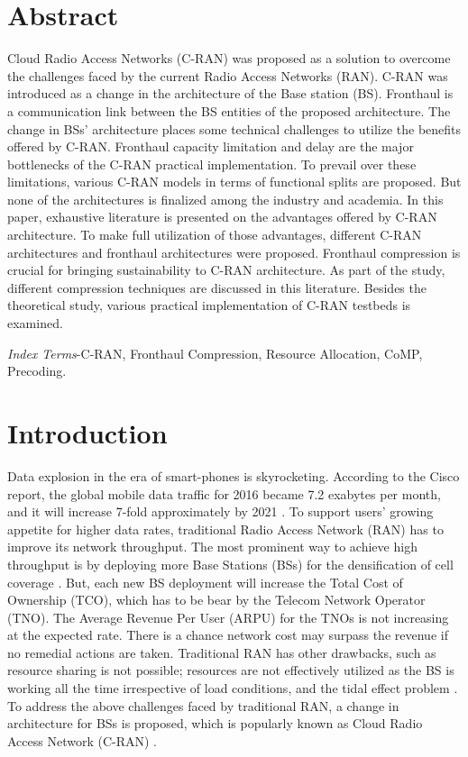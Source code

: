 \begin{multicols}{2}

\section*{Abstract}

Cloud Radio Access Networks (C-RAN) was proposed as a solution to overcome the challenges faced by the current Radio Access Networks (RAN). C-RAN was introduced as a change in the architecture of the Base station (BS). Fronthaul is a communication link between the BS entities of the proposed architecture. The change in BSs’ architecture places some technical challenges to utilize the benefits offered by C-RAN. Fronthaul capacity limitation and delay are the major bottlenecks of the C-RAN practical implementation. To prevail over these limitations, various C-RAN models in terms of functional splits are proposed. But none of the architectures is finalized among the industry and academia. In this paper, exhaustive literature is presented on the advantages offered by C-RAN architecture. To make full utilization of those advantages, different C-RAN architectures and fronthaul architectures were proposed. Fronthaul compression is crucial for bringing sustainability to C-RAN architecture. As part of the study, different compression techniques are discussed in this literature. Besides the theoretical study, various practical implementation of C-RAN testbeds is examined.

\textit{Index Terms}-C-RAN, Fronthaul Compression, Resource Allocation, CoMP, Precoding.

\section{Introduction}

Data explosion in the era of smart-phones is skyrocketing. According to the Cisco report, the global mobile data traffic for 2016 became 7.2 exabytes per month, and it will increase 7-fold approximately by 2021 \cite{art3-key01}. To support users’ growing appetite for higher data rates, traditional Radio Access Network (RAN) has to improve its network throughput. The most prominent way to achieve high throughput is by deploying more Base Stations (BSs) for the densification of cell coverage \cite{art3-key02}. But, each new BS deployment will increase the Total Cost of Ownership (TCO), which has to be bear by the Telecom Network Operator (TNO). The Average Revenue Per User (ARPU) for the TNOs is not increasing at the expected rate. There is a chance network cost may surpass the revenue if no remedial actions are taken. Traditional RAN has other drawbacks, such as resource sharing is not possible; resources are not effectively utilized as the BS is working all the time irrespective of load conditions, and the tidal effect problem \cite{art3-key03}. To address the above challenges faced by traditional RAN, a change in architecture for BSs is proposed, which is popularly known as Cloud Radio Access Network (C-RAN) \cite{art3-key04}.


\end{multicols}
